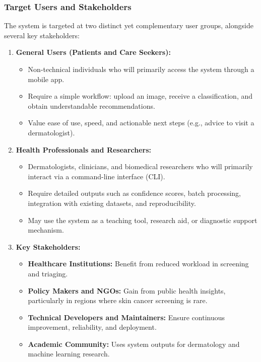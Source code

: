 \documentclass[
  12pt,
  oneside]{article}
\providecommand{\tightlist}{%
  \setlength{\itemsep}{0pt}\setlength{\parskip}{0pt}}
\begin{document}
\subsubsection{Target Users and
Stakeholders}\label{target-users-and-stakeholders}

The system is targeted at two distinct yet complementary user groups,
alongside several key stakeholders:

\begin{enumerate}
\def\labelenumi{\arabic{enumi}.}
\item
  \textbf{General Users (Patients and Care Seekers):}

  \begin{itemize}
  \tightlist
  \item
    Non-technical individuals who will primarily access the system
    through a mobile app.\\
  \item
    Require a simple workflow: upload an image, receive a
    classification, and obtain understandable recommendations.\\
  \item
    Value ease of use, speed, and actionable next steps (e.g., advice to
    visit a dermatologist).
  \end{itemize}
\item
  \textbf{Health Professionals and Researchers:}

  \begin{itemize}
  \tightlist
  \item
    Dermatologists, clinicians, and biomedical researchers who will
    primarily interact via a command-line interface (CLI).\\
  \item
    Require detailed outputs such as confidence scores, batch
    processing, integration with existing datasets, and
    reproducibility.\\
  \item
    May use the system as a teaching tool, research aid, or diagnostic
    support mechanism.
  \end{itemize}
\item
  \textbf{Key Stakeholders:}

  \begin{itemize}
  \tightlist
  \item
    \textbf{Healthcare Institutions:} Benefit from reduced workload in
    screening and triaging.\\
  \item
    \textbf{Policy Makers and NGOs:} Gain from public health insights,
    particularly in regions where skin cancer screening is rare.\\
  \item
    \textbf{Technical Developers and Maintainers:} Ensure continuous
    improvement, reliability, and deployment.\\
  \item
    \textbf{Academic Community:} Uses system outputs for dermatology and
    machine learning research.
  \end{itemize}
\end{enumerate}
\end{document}
